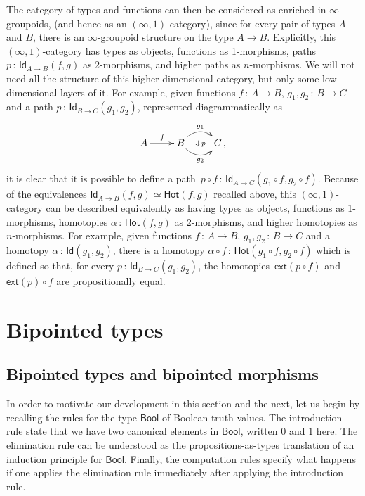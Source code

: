 \documentclass[10pt,a4paper,oneside,reqno]{amsart}
\numberwithin{equation}{section}
\theoremstyle{mythm}
\theoremstyle{mydef}
\theoremstyle{myrmk}
\newcommand{\co}{\,{:}\,}
\newcommand{\Hot}{\mathsf{Hot}}
\newcommand{\ext}{\mathsf{ext}}
\newcommand{\Bool}{\mathsf{Bool}}
\newcommand{\Id}{\mathsf{Id}}
\begin{document}
The category of types and functions can then be considered as enriched in $\infty$-groupoids,
(and hence as an $(\infty, 1)$-category),  since for every pair of types $A$ and $B$, there is an
$\infty$-groupoid structure on the type $A \to B$. Explicitly, this $(\infty, 1)$-category has types as objects,
functions as 1-morphisms, paths $p \co \Id_{A \to B}(f, g)$ as 2-morphisms, and higher paths as $n$-morphisms. We will not need all the structure of this higher-dimensional category, but only some low-dimensional layers of it.  For example, given functions $f \co A \to B$, $g_1, g_2 \co B \to C$ and a path $p \co \Id_{B \to C}(g_1, g_2)$, represented diagrammatically as 
\[
\xymatrix{
A \ar[r]^{f} & B \ar@/^1pc/[r]^{g_1} \ar@/_1pc/[r]_{g_2} \ar@{}[r]|{\Downarrow \, p}  & C \, ,}
\]
it is clear that it is possible to define a path~$p \circ f \co \Id_{A \to C} (g_1 \circ f,  g_2 \circ f)$. Because of the equivalences $\Id_{A \to B}(f,g) \simeq \Hot(f,g)$ recalled above, this $(\infty,1)$-category can be described equivalently
as having  types as objects, functions as 1-morphisms, homotopies $\alpha \co \Hot(f, g)$ as 2-morphisms, and higher homotopies as $n$-morphisms. For example, given functions $f \co A \to B$, $g_1, g_2 \co B \to C$ and a homotopy $\alpha \co \Id(g_1, g_2)$, there is a homotopy $\alpha \circ f \co \Hot(g_1 \circ f, g_2 \circ f)$ which is defined so that, for every $p \co \Id_{B \to C}(g_1, g_2)$, the homotopies~$\ext( p \circ f )$ and  $\ext(p) \circ f$ are propositionally equal. 



\section{Bipointed types}
\label{sec:bip}

\subsection{Bipointed types and bipointed morphisms} \label{sec:biptm}
In order to motivate our development in this section and the next, 
let us begin by recalling the rules for the type $\Bool$ of Boolean truth values. The introduction rule state that we have two canonical elements in $\Bool$, written $0$ and $1$ here. The elimination rule can be understood as the propositions-as-types translation of an induction principle for $\Bool$. Finally, the computation rules specify what happens if one applies the elimination rule immediately after applying the introduction rule.
\end{document}
